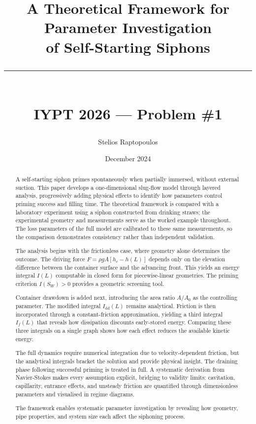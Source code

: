\documentclass[11pt]{article}
\title{A Theoretical Framework for Parameter Investigation\\
       of Self-Starting Siphons\\[0.75em]
       \rule{0.7\textwidth}{0.4pt}\\[0.75em]
       \large IYPT 2026 --- Problem \#1}
\author{Stelios Raptopoulos}
\date{December 2024}
\begin{document}
\maketitle

\begin{abstract}
A self-starting siphon primes spontaneously when partially immersed, without external suction. This paper develops a one-dimensional slug-flow model through layered analysis, progressively adding physical effects to identify how parameters control priming success and filling time. The theoretical framework is compared with a laboratory experiment using a siphon constructed from drinking straws; the experimental geometry and measurements serve as the worked example throughout. The loss parameters of the full model are calibrated to these same measurements, so the comparison demonstrates consistency rather than independent validation.

The analysis begins with the frictionless case, where geometry alone determines the outcome. The driving force $F = \rho g A [h_c - h(L)]$ depends only on the elevation difference between the container surface and the advancing front. This yields an energy integral $I(L)$ computable in closed form for piecewise-linear geometries. The priming criterion $I(S_W) > 0$ provides a geometric screening tool.

Container drawdown is added next, introducing the area ratio $A/A_0$ as the controlling parameter. The modified integral $I_{\text{dd}}(L)$ remains analytical. Friction is then incorporated through a constant-friction approximation, yielding a third integral $I_f(L)$ that reveals how dissipation discounts early-stored energy. Comparing these three integrals on a single graph shows how each effect reduces the available kinetic energy.

The full dynamics require numerical integration due to velocity-dependent friction, but the analytical integrals bracket the solution and provide physical insight. The draining phase following successful priming is treated in full. A systematic derivation from Navier-Stokes makes every assumption explicit, bridging to validity limits: cavitation, capillarity, entrance effects, and unsteady friction are quantified through dimensionless parameters and visualised in regime diagrams.

The framework enables systematic parameter investigation by revealing how geometry, pipe properties, and system size each affect the siphoning process.
\end{abstract}
\end{document}
